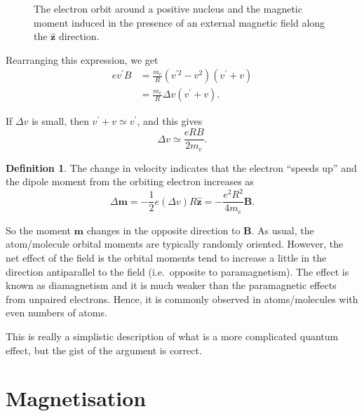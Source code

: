 \documentclass[12pt,chapterprefix=false,dvipsnames]{scrbook}
\theoremstyle{dotless}
\theoremstyle{definition}
\newtheorem{protodefinition}{Definition}[section]
\newenvironment{definition}
{\colorlet{shadecolor}{black!15}\begin{shaded}\begin{protodefinition}}
			{\end{protodefinition}\end{shaded}}
\begin{document}
\begin{figure}[htpb]
	\centering
	
	\caption{The electron orbit around a positive nucleus and the magnetic
		moment induced in the presence of an external magnetic field
		along the $\bm{\hat{z}}$ direction.}%
	\label{fig:diamagnetic}
\end{figure}

Rearranging this expression, we get
\begin{equation}
	\begin{aligned}
		ev^\prime B & = \frac{m_e}{R}\left(v^{\prime 2} - v^2\right)\left(v^{\prime}+v\right) \\
		            & = \frac{m_e}{R}\Delta{v}\left(v^{\prime} + v\right).
	\end{aligned}
\end{equation}

If $\Delta{v}$ is small, then
$v^\prime + v \simeq v^\prime$, and this gives
\begin{equation}
	\Delta{v}\simeq\frac{eRB}{2m_e}.
\end{equation}

\begin{definition}
	The change in velocity indicates that the electron ``speeds up''
	and the dipole moment from the orbiting electron increases as
	\begin{equation}
		\Delta{\bm{m}}
		=
		-\frac{1}{2}e\left(\Delta{v}\right)R\bm{\hat{z}}
		=
		-\frac{e^{2}R^{2}}{4m_e}\bm{B}.
	\end{equation}
\end{definition}

So the moment $\bm{m}$ changes in the opposite
direction to $\bm{B}$. As usual, the
atom/molecule orbital moments are typically randomly oriented.
However, the net effect of the field is the orbital moments tend
to increase a little in the direction antiparallel to the field
(i.e.\ opposite to paramagnetism). The effect is known as
diamagnetism and it is much weaker than the paramagnetic effects
from unpaired electrons. Hence, it is commonly observed in
atoms/molecules with even numbers of atoms.

This is really a simplistic description of what is a more
complicated quantum effect, but the gist of the argument is
correct.

\section{Magnetisation}%
\label{sec:magnetisation}
\end{document}
